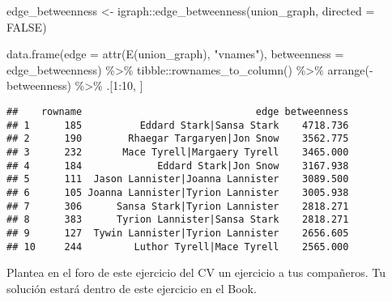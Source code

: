 \documentclass[
]{book}
\newenvironment{Shaded}{\begin{snugshade}}{\end{snugshade}}
\newcommand{\AttributeTok}[1]{\textcolor[rgb]{0.77,0.63,0.00}{#1}}
\newcommand{\CommentTok}[1]{\textcolor[rgb]{0.56,0.35,0.01}{\textit{#1}}}
\newcommand{\ConstantTok}[1]{\textcolor[rgb]{0.00,0.00,0.00}{#1}}
\newcommand{\DecValTok}[1]{\textcolor[rgb]{0.00,0.00,0.81}{#1}}
\newcommand{\FloatTok}[1]{\textcolor[rgb]{0.00,0.00,0.81}{#1}}
\newcommand{\FunctionTok}[1]{\textcolor[rgb]{0.00,0.00,0.00}{#1}}
\newcommand{\NormalTok}[1]{#1}
\newcommand{\OtherTok}[1]{\textcolor[rgb]{0.56,0.35,0.01}{#1}}
\newcommand{\SpecialCharTok}[1]{\textcolor[rgb]{0.00,0.00,0.00}{#1}}
\newcommand{\StringTok}[1]{\textcolor[rgb]{0.31,0.60,0.02}{#1}}
\begin{document}
\begin{Shaded}
\begin{Highlighting}[]
\NormalTok{edge\_betweenness }\OtherTok{\textless{}{-}}\NormalTok{ igraph}\SpecialCharTok{::}\FunctionTok{edge\_betweenness}\NormalTok{(union\_graph, }\AttributeTok{directed =} \ConstantTok{FALSE}\NormalTok{)}

\FunctionTok{data.frame}\NormalTok{(}\AttributeTok{edge =} \FunctionTok{attr}\NormalTok{(}\FunctionTok{E}\NormalTok{(union\_graph), }\StringTok{"vnames"}\NormalTok{),}
           \AttributeTok{betweenness =}\NormalTok{ edge\_betweenness) }\SpecialCharTok{\%\textgreater{}\%}
\NormalTok{  tibble}\SpecialCharTok{::}\FunctionTok{rownames\_to\_column}\NormalTok{() }\SpecialCharTok{\%\textgreater{}\%}
  \FunctionTok{arrange}\NormalTok{(}\SpecialCharTok{{-}}\NormalTok{betweenness) }\SpecialCharTok{\%\textgreater{}\%}
\NormalTok{  .[}\DecValTok{1}\SpecialCharTok{:}\DecValTok{10}\NormalTok{, ]}
\end{Highlighting}
\end{Shaded}

\begin{verbatim}
##    rowname                              edge betweenness
## 1      185          Eddard Stark|Sansa Stark    4718.736
## 2      190        Rhaegar Targaryen|Jon Snow    3562.775
## 3      232       Mace Tyrell|Margaery Tyrell    3465.000
## 4      184             Eddard Stark|Jon Snow    3167.938
## 5      111  Jason Lannister|Joanna Lannister    3089.500
## 6      105 Joanna Lannister|Tyrion Lannister    3005.938
## 7      306      Sansa Stark|Tyrion Lannister    2818.271
## 8      383      Tyrion Lannister|Sansa Stark    2818.271
## 9      127  Tywin Lannister|Tyrion Lannister    2656.605
## 10     244         Luthor Tyrell|Mace Tyrell    2565.000
\end{verbatim}

Plantea en el foro de este ejercicio del CV un ejercicio a tus compañeros. Tu solución estará dentro de este ejercicio en el Book.

\begin{Shaded}
\end{Shaded}
\end{document}
